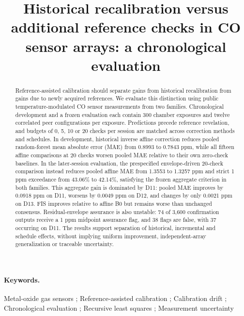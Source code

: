 \documentclass[11pt]{article}
\date{}
\begin{document}
\title{Historical recalibration versus additional reference checks in CO sensor arrays: a chronological evaluation}

\maketitle
\begin{abstract}
Reference-assisted calibration should separate gains from historical recalibration from gains due to newly acquired references. We evaluate this distinction using public temperature-modulated CO sensor measurements from two families. Chronological development and a frozen evaluation each contain 300 chamber exposures and twelve correlated peer configurations per exposure. Predictions precede reference revelation, and budgets of 0, 5, 10 or 20 checks per session are matched across correction methods and schedules. In development, historical inverse affine correction reduces pooled random-forest mean absolute error (MAE) from 0.8993 to 0.7843 ppm, while all fifteen affine comparisons at 20 checks worsen pooled MAE relative to their own zero-check baselines. In the later-session evaluation, the prespecified envelope-driven 20-check comparison instead reduces pooled affine MAE from 1.3553 to 1.3257 ppm and strict 1 ppm exceedance from 43.06\% to 42.14\%, satisfying the frozen aggregate criterion in both families. This aggregate gain is dominated by D11: pooled MAE improves by 0.0918 ppm on D11, worsens by 0.0049 ppm on D12, and changes by only 0.0021 ppm on D13. FIS improves relative to affine B0 but remains worse than unchanged consensus. Residual-envelope assurance is also unstable: 74 of 3,600 confirmation outputs receive a 1 ppm midpoint assurance flag, and 38 flags are false, with 37 occurring on D11. The results support separation of historical, incremental and schedule effects, without implying uniform improvement, independent-array generalization or traceable uncertainty.
\end{abstract}
\paragraph{Keywords.}
Metal-oxide gas sensors ; Reference-assisted calibration ; Calibration drift ; Chronological evaluation ; Recursive least squares ; Measurement uncertainty








\end{document}
